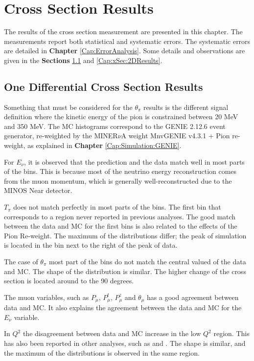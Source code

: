 \chapter{Cross Section Results}
\minitoc
\label{Cap:xSec}

The results of the cross section measurement are presented in this chapter. The measurements report both statistical and systematic errors. The systematic errors are detailed in \textbf{Chapter} \ref{Cap:ErrorAnalysis}. Some details and observations are given in the \textbf{Sections} \ref{Cap:xSec:1DResults} and \ref{Cap:xSec:2DResults}.

\section{One Differential Cross Section Results}
\label{Cap:xSec:1DResults}

Something that must be considered for the $\theta_\pi$ results is the different signal definition where the kinetic energy of the pion is constrained between 20 MeV and 350 MeV. The MC histograms correspond to the GENIE 2.12.6 event generator, re-weighted by the MINER$\nu$A weight MnvGENIE v4.3.1 + Pion re-weight, as explained in \textbf{Chapter} \ref{Cap:Simulation:GENIE}.

For $E_\nu$, it is observed that the prediction and the data match well in most parts of the bins. This is because most of the neutrino energy reconstruction comes from the muon momentum, which is generally well-reconstructed due to the MINOS Near detector.

$T_\pi$ does not match perfectly in most parts of the bins. The first bin that corresponds to a region never reported in previous analyses. The good match between the data and MC for the first bins is also related to the effects of the Pion Re-weight. The maximum of the distributions differ; the peak of simulation is located in the bin next to the right of the peak of data. 

The case of $\theta_\pi$ most part of the bins do not match the central valued of the data and MC. The shape of the distribution is similar. The higher change of the cross section is located around to the 90 degrees. 

The muon variables, such as $P_\mu$, $P^t_\mu$, $P^z_\mu$ and $\theta_\mu$ has a good agreement between data and MC. It also explains the agreement between the data and MC for the $E_\nu$ variable. 

In $Q^2$ the disagreement between data and MC increase in the low $Q^2$ region. This has also been reported in other analyses, such as \cite{Bercellie.131.011801} and \cite{Eberly:2014mra}. The shape is similar, and the maximum of the distributions is observed in the same region.

